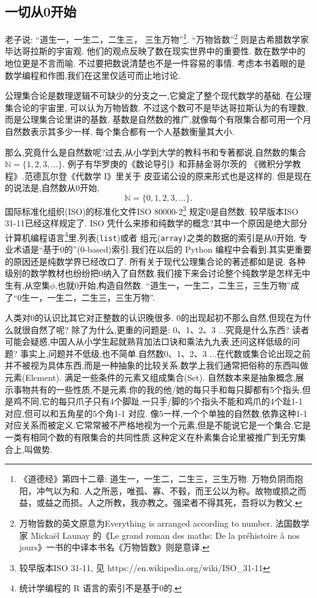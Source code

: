 \documentclass[main.tex]{subfiles}
\begin{document}
\subsection{一切从0开始}
老子说: “道生一，一生二，二生三，
三生万物”\footnote{《道德经》第四十二章: 道生一，一生二，二生三，三生万物. 万物负阴而抱阳，冲气以为和. 人之所恶，唯孤、寡、不毂，而王公以为称。故物或损之而益，或益之而损。人之所教，我亦教之。强梁者不得其死，吾将以为教父.}.
“万物皆数”\footnote{万物皆数的英文原意为Everything is arranged according to number. 
	法国数学家 Mickaël Launay 的《Le grand roman des maths: De la préhistoire à nos jours》一书的中译本书名《万物皆数》则是意译.}
则是古希腊数学家毕达哥拉斯的宇宙观. 他们的观点反映了数在现实世界中的重要性. 数在数学中的地位更是不言而喻.
不过要把数说清楚也不是一件容易的事情. 考虑本书着眼的是数学编程和作图,我们在这里仅适可而止地讨论. 

公理集合论是数理逻辑不可缺少的分支之一,它奠定了整个现代数学的基础. 在公理集合论的宇宙里, 可以认为万物皆数. 
不过这个数可不是毕达哥拉斯认为的有理数, 而是公理集合论里讲的基数.
基数是自然数的推广,就像每个有限集合都可用一个月自然数表示其多少一样,
每个集合都有一个人基数衡量其大小.

那么,究竟什么是自然数呢?过去,从小学到大学的教科书和专著都说,自然数的集合$\mathbb{N} = \{1, 2, 3, \dots\}$.
例子有华罗庚的《数论导引》\cite{HuaL}和菲赫金哥尔茨的
《微积分学教程》\cite{FeiH1}.范德瓦尔登《代数学 I》\cite{derWaerden}里关于
皮亚诺公设的原来形式也是这样的.
但是现在的说法是,自然数从0开始, 
$$\mathbb{N} = \{0,1, 2, 3, \dots\}.$$
 国际标准化组织(ISO)的标准化文件ISO 80000-2\footnote{较早版本ISO 31-11, 见  https://en.wikipedia.org/wiki/ISO\_31-11}
 规定0是自然数. 较早版本ISO 31-11已经这样规定了. ISO 凭什么来掺和纯数学的概念?其中一个原因是绝大部分计算机编程语言\footnote{统计学编程的 R 语言的索引不是基于0的.}里,列表(\texttt{list})或者
 组元(\texttt{array)}之类的数据的索引是从0开始,
 专业术语是“基于0的”(0-based)索引.我们在以后的 Python 编程中会看到.其实更重要的原因还是纯数学界已经改口了.
 所有关于现代公理集合论的著述都如是说\cite{HalmosP}\cite{KelleyJ}\cite{JiangJi}. 各种级别的数学教材也纷纷把0纳入了自然数.我们接下来会讨论整个纯数学是怎样无中生有,从空集$\phi$,也就0开始,构造自然数.
“道生一，一生二，二生三，三生万物”成了“0生一，一生二，二生三，三生万物”.

人类对0的认识比其它对正整数的认识晚很多. 0的出现起初不那么自然,但现在为什么就很自然了呢?
除了为什么,更重的问题是: 0、1、2、3 ...究竟是什么东西?
读者可能会疑惑,中国人从小学生起就熟背加法口诀和乘法九九表,还问这样低级的问题?
事实上,问题并不低级,也不简单.自然数0、1、2、3 ...在代数或集合论出现之前并不被视为具体东西,而是一种抽象的比较关系.数学上我们通常把俗称的东西叫做元素(Element).
满足一些条件的元素又组成集合(Set).
自然数本来是抽象概念,展示事物共有的一些性质,不是元素.你的我的他/她的每只手和每只脚都有5个指头.但是鸡不同,它的每只爪子只有4个脚趾.一只手/脚的5个指头不能和鸡爪的4个趾1-1 对应,但可以和五角星的5个角1-1 对应.
像5一样,一个个单独的自然数,依靠这种1-1 对应关系而被定义.它常常被不严格地视为一个元素,但是不能说它是一个集合.它是一类有相同个数的有限集合的共同性质.这种定义在朴素集合论里被推广到无穷集合上,叫做势.
\end{document}

